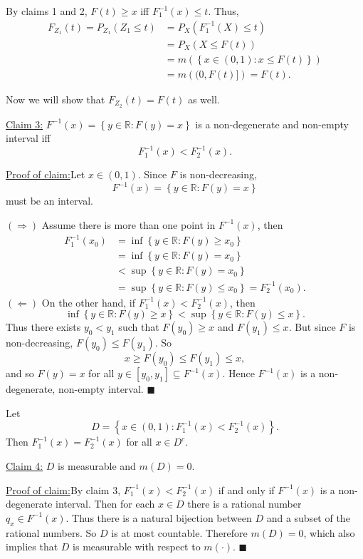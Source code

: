 \documentclass[12pt]{article}
\newenvironment{claimproof}[1]{\par\noindent\underline{Proof of claim:}\space#1}{\hfill $\blacksquare$\vspace{5mm}}
\begin{document}
By claims 1 and 2, $F(t) \geq x$ iff $F_{1}^{-1}(x) \leq t$. Thus,
\begin{align*}
F_{Z_{1}}(t) = P_{Z_{1}}(Z_{1} \leq t) & = P_{X}(F_{1}^{-1}(X) \leq t) \\
& = P_{X}(X \leq F(t)) \\
& = m\left( \left\{ x \in (0,1) : x \leq F(t) \right\} \right) \\
& = m\left( (0, F(t)] \right) = F(t).
\end{align*}

Now we will show that $F_{Z_{2}}(t) = F(t)$ as well. 

\underline{Claim 3:} $F^{-1}(x) = \left\{ y \in \mathbb{R} : F(y) = x \right\}$ is a non-degenerate and non-empty interval iff 
\[ F_{1}^{-1}(x) < F_{2}^{-1}(x). \]
\begin{claimproof}
Let $x \in (0,1)$. Since $F$ is non-decreasing, 
\[ F^{-1}(x) = \left\{ y \in \mathbb{R} : F(y) = x \right\} \] 
must be an interval. 

$(\Rightarrow)$ Assume there is more than one point in $F^{-1}(x)$, then 
\begin{align*}
F_{1}^{-1}(x_{0}) & = \inf\left\{ y \in \mathbb{R} : F(y) \geq x_{0} \right\} \\
&  = \inf\left\{ y \in \mathbb{R} : F(y) = x_{0} \right\} \\
& < \sup\left\{ y \in \mathbb{R} : F(y) = x_{0} \right\} \\
& = \sup\left\{ y \in \mathbb{R} : F(y) \leq x_{0} \right\} = F_{2}^{-1}(x_{0}).
\end{align*}
$(\Leftarrow)$ On the other hand, if $F_{1}^{-1}(x) < F_{2}^{-1}(x)$, then 
\[ \inf\left\{ y \in \mathbb{R} : F(y) \geq x \right\} < \sup\left\{ y \in \mathbb{R} : F(y) \leq x \right\}. \]
Thus there exists $y_{0} < y_{1}$ such that $F(y_{0}) \geq x$ and $F(y_{1}) \leq x$. But since $F$ is non-decreasing, $F(y_{0}) \leq F(y_{1})$. So 
\[ x \geq F(y_{0}) \leq F(y_{1}) \leq x, \]
and so $F(y) = x$ for all $y \in [y_{0}, y_{1}] \subseteq F^{-1}(x)$. Hence $F^{-1}(x)$ is a non-degenerate, non-empty interval.
\end{claimproof}

Let 
\[ D = \left\{ x \in (0,1) : F_{1}^{-1}(x) < F_{2}^{-1}(x) \right\}. \]
Then $F_{1}^{-1}(x) = F_{2}^{-1}(x)$ for all $x \in D^{c}$.

\underline{Claim 4:} $D$ is measurable and $m(D) = 0$.
\begin{claimproof}
By claim 3, $F_{1}^{-1}(x) < F_{2}^{-1}(x)$ if and only if $F^{-1}(x)$ is a non-degenerate interval. 
Then for each $x \in D$ there is a rational number $q_{x} \in F^{-1}(x)$. Thus there is a natural bijection between $D$
and a subset of the rational numbers. So $D$ is at most countable. Therefore $m(D) = 0$, which
also implies that $D$ is measurable with respect to $m(\cdot)$.
\end{claimproof}
\end{document}

